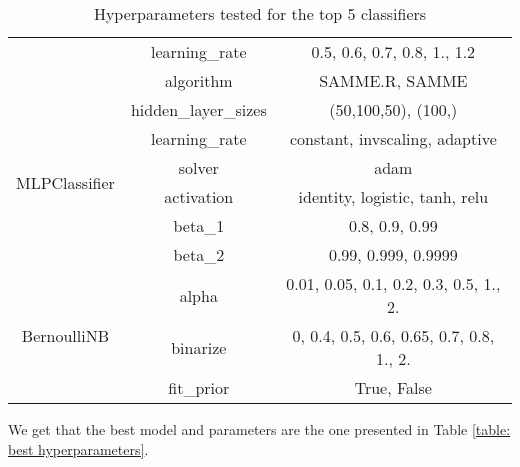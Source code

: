 \documentclass[12pt]{article}
\begin{document}
\begin{table}
\begin{tabular}{ccc}
                                                    & learning\_rate          & 0.5, 0.6, 0.7, 0.8, 1., 1.2              \\
                                                    & algorithm               & SAMME.R, SAMME                           \\
        \midrule
        \multirow{6}{*}{MLPClassifier}              & hidden\_layer\_sizes    & (50,100,50), (100,)                      \\
                                                    & learning\_rate          & constant, invscaling, adaptive           \\
                                                    & solver                  & adam                                     \\
                                                    & activation              & identity, logistic, tanh, relu           \\
                                                    & beta\_1                 & 0.8, 0.9, 0.99                           \\
                                                    & beta\_2                 & 0.99, 0.999, 0.9999                      \\
        \midrule
        \multirow{3}{*}{BernoulliNB}                & alpha                   & 0.01, 0.05, 0.1, 0.2, 0.3, 0.5, 1., 2.   \\
                                                    & binarize                & 0, 0.4, 0.5, 0.6, 0.65, 0.7, 0.8, 1., 2. \\
                                                    & fit\_prior              & True, False                              \\
        \bottomrule
    \end{tabular}
    \caption{Hyperparameters tested for the top 5 classifiers}
    \label{table: hyperparameters tested}
\end{table}
We get that the best model and parameters are the one presented in Table \ref{table: best hyperparameters}.
\end{document}
